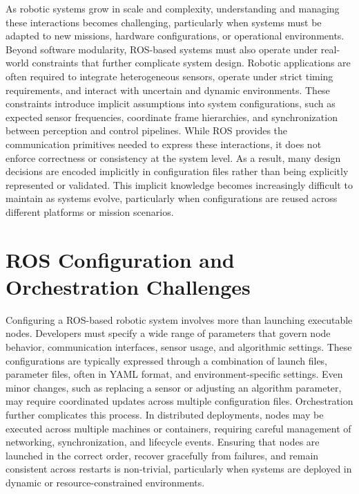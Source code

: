As robotic systems grow in scale and complexity, understanding and managing these interactions becomes challenging,
particularly when systems must be adapted to new missions, hardware configurations, or operational environments. 
Beyond software modularity, ROS-based systems must also operate under real-world constraints that further complicate system design. Robotic
applications are often required to integrate heterogeneous sensors, operate under strict timing requirements, and interact with uncertain
and dynamic environments. These constraints introduce implicit assumptions into system configurations, such as expected sensor frequencies,
coordinate frame hierarchies, and synchronization between perception and control pipelines. While ROS provides the communication primitives
needed to express these interactions, it does not enforce correctness or consistency at the system level. As a result, many design decisions 
are encoded implicitly in configuration files rather than being explicitly represented or validated. This implicit knowledge becomes increasingly
difficult to maintain as systems evolve, particularly when configurations are reused across different platforms or mission scenarios.

\section{ROS Configuration and Orchestration Challenges}
Configuring a ROS-based robotic system involves more than launching executable nodes. Developers must specify a wide range of parameters that govern
node behavior, communication interfaces, sensor usage, and algorithmic settings. These configurations are typically expressed through a combination 
of launch files, parameter files, often in YAML format, and environment-specific settings. Even minor changes, such as replacing a sensor or adjusting
an algorithm parameter, may require coordinated updates across multiple configuration files. Orchestration further complicates this process. In 
distributed deployments, nodes may be executed across multiple machines or containers, requiring careful management of networking, synchronization, 
and lifecycle events. Ensuring that nodes are launched in the correct order, recover gracefully from failures, and remain consistent across restarts 
is non-trivial, particularly when systems are deployed in dynamic or resource-constrained environments. 

